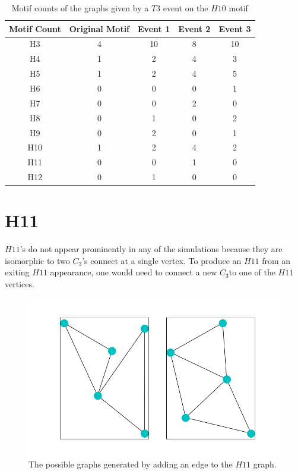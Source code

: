 \begin{table}
    \centering
    \begin{tabular}{||c c c c c||} 
    \hline
    Motif Count & Original Motif & Event 1 & Event 2 & Event 3 \\ [0.5ex] 
    \hline\hline
    H3 & 4 & 10 & 8 & 10 \\ 
    \hline
    H4 & 1 & 2 & 4 & 3 \\
    \hline
    H5 & 1 & 2 & 4 & 5\\
    \hline
    H6 & 0 & 0 & 0 & 1 \\
    \hline
    H7 & 0 & 0 & 2 & 0 \\
    \hline
    H8 & 0 & 1 & 0 & 2\\
    \hline
    H9 & 0 & 2 & 0 & 1\\
    \hline
    H10 & 1 & 2 & 4 & 2\\
    \hline
    H11 & 0 & 0 & 1 & 0\\
    \hline
    H12 & 0 & 1 & 0 & 0\\
    \hline
   \end{tabular}
   \caption{Motif counts of the graphs given by a $T3$ event on the $H10$ motif}
   \label{table:19}
\end{table}

\section{H11}
$H11$'s do not appear prominently in any of the simulations because they are isomorphic to
two $C_3$'s connect at a single vertex. To produce an $H11$ from an exiting $H11$ appearance,
one would need to connect a new $C_3$to one of the $H11$ vertices.

\begin{figure}
    \includegraphics[width=12cm]{Images/H11_T3_evolution.png}
    \centering
    \caption{The possible graphs generated by adding an edge to the $H11$ graph.}
\end{figure}

